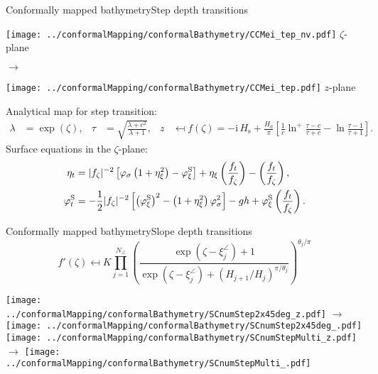 \documentclass{sintefbeamer}
\newcommand{\mr}{\mathrm}
\renewcommand{\S}{^\mr{S}}
\newcommand{\ii}{\mr{i}\,}
\renewcommand{\_}[1]{_\mr{#1}}
\let\Re\relax
\let\Im\relax
\DeclareMathOperator\Re{Re}
\DeclareMathOperator\Im{Im}
\newcommand{\zmap}{f}
\newcommand{\iJac}{|\zmap_\zz|^{-2}}
\newcommand{\z}{z}
\newcommand{\zz}{\zeta}
\newcommand{\xx}{\xi}
\newcommand{\yy}{\sigma}
\newcommand{\rbr}[1]{\left(#1\right)}
\newcommand{\sbr}[1]{\left[#1\right]}
\begin{document}
\begin{frame}{Conformally mapped bathymetry}{Step depth transitions}
\vspace{-.5cm}
\parbox[c]{.45\framewidth}{\centering
\texttt{[image: ../conformalMapping/conformalBathymetry/CCMei\_step\_inv.pdf]}
$\zz$-plane
}
\hfill$\rightarrow$ \hfill
\parbox[c]{.45\framewidth}{\centering
\texttt{[image: ../conformalMapping/conformalBathymetry/CCMei\_step.pdf]}
$\z$-plane
}

\footnotesize
Analytical map for step transition:
\begin{align*}
\lambda &= \exp(\zz),&
\tau &= \sqrt{\frac{\lambda+c^2}{\lambda+1} },&
z &\mapsfrom f(\zz) = -\ii H\_s +\frac{H\_d}{\pi}\left[\frac1c \ln^+\frac{\tau-c}{\tau+c} - \ln\frac{\tau-1}{\tau+1}\right].
\end{align*}%
Surface equations in the $\zz$-plane:
\begin{align*}
\eta_t &= \iJac\sbr{\varphi_\yy\rbr{1+\eta_\xx^2}-\varphi\S_\xx} + \eta_\xx \Re\rbr{\frac{\zmap_t}{\zmap_\zz}}-\Im\rbr{\frac{\zmap_t}{\zmap_\zz}},\\
\varphi\S_t &= - \frac12\iJac\sbr{\rbr{\varphi\S_\xx}^2-\rbr{1+\eta_\xx^2}\varphi_\yy^2} - gh + \varphi\S_\xx \Re\rbr{ \frac{\zmap_t}{\zmap_\zz}}.
\end{align*}

\end{frame}



\begin{frame}{Conformally mapped bathymetry}{Slope depth transitions}
\vspace{-1cm}
\small
\begin{equation*}
f'(\zz) \mapsfrom K \prod_{j=1}^{N_\angle} \rbr{\frac{\exp(\zz-\xi^\angle_j)+1}{\exp(\zz-\xx^\angle_j) + (H_{j+1}/H_j)^{\pi/\theta_j}}}^{\theta_j/\pi}
\end{equation*}
\normalsize

\texttt{[image: ../conformalMapping/conformalBathymetry/SCnumStep2x45deg\_zz.pdf]}
$\rightarrow$
\texttt{[image: ../conformalMapping/conformalBathymetry/SCnumStep2x45deg\_z.pdf]}
\\


\texttt{[image: ../conformalMapping/conformalBathymetry/SCnumStepMulti\_zz.pdf]}
$\rightarrow$
\texttt{[image: ../conformalMapping/conformalBathymetry/SCnumStepMulti\_z.pdf]}

\end{frame}
\end{document}
